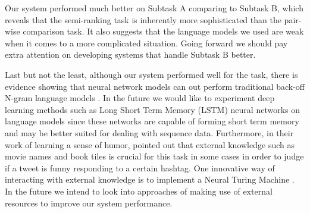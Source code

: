 \documentclass[11pt,a4paper]{article}
\begin{document}
Our system performed much better on Subtask A comparing to Subtask B, which reveals that the semi-ranking task is inherently more sophisticated than the pair-wise comparison task. It also suggests that the language models we used are weak when it comes to a more complicated situation. Going forward we should pay extra attention on developing systems that handle Subtask B better.

Last but not the least, although our system performed well for the task, there is evidence showing that neural network models can out perform traditional back-off N-gram language models \cite{mikolov2011extensions}. In the future we would like to experiment deep learning methods such as Long Short Term Memory (LSTM) neural networks on language models since these networks are capable of forming short term memory and may be better suited for dealing with sequence data. Furthermore, in their work of learning a sense of humor, \cite{2016hashtagwars} pointed out that external knowledge such as movie names and book tiles is crucial for this task in some cases in order to judge if a tweet is funny responding to a certain hashtag. One innovative way of interacting with external knowledge is to implement a Neural Turing Machine \cite{graves2014neural}. In the future we intend to look into approaches of making use of external resources to improve our system performance.

%
%


\end{document}
